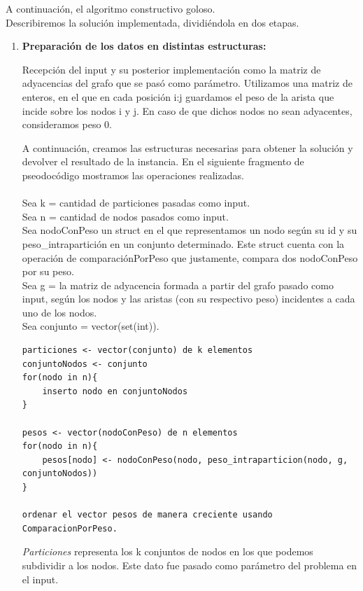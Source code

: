 \documentclass[10pt,a4paper]{article}
\begin{document}
A continuación, el algoritmo constructivo goloso.\\
Describiremos la solución implementada, dividiéndola en dos etapas.

\bigskip
\begin{enumerate}
\item


\textbf{Preparación de los datos en distintas estructuras:} 

Recepción del input y su posterior implementación como la matriz de adyacencias del grafo que se pasó como parámetro. Utilizamos una matriz de enteros, en el que en cada posición i:j guardamos el peso de la arista que incide sobre los nodos i y j. En caso de que dichos nodos no sean adyacentes, consideramos peso 0.

A continuación, creamos las estructuras necesarias para obtener la solución y devolver el resultado de la instancia. En el siguiente fragmento de pseodocódigo mostramos las operaciones realizadas.\\\\

Sea k = cantidad de particiones pasadas como input.\\
Sea n = cantidad de nodos pasados como input.\\
Sea nodoConPeso un struct en el que representamos un nodo según su id y su peso\_intrapartición en un conjunto determinado. Este struct cuenta con la operación de comparaciónPorPeso que justamente, compara dos nodoConPeso por su peso.\\
Sea g = la matriz de adyacencia formada a partir del grafo pasado como input, según los nodos y las aristas (con su respectivo peso) incidentes a cada uno de los nodos.\\
Sea conjunto = vector(set(int)).\\
\newpage

\begin{lstlisting}[mathescape]
particiones <- vector(conjunto) de k elementos
conjuntoNodos <- conjunto
for(nodo in n){
	inserto nodo en conjuntoNodos
}

pesos <- vector(nodoConPeso) de n elementos
for(nodo in n){
	pesos[nodo] <- nodoConPeso(nodo, peso_intraparticion(nodo, g, conjuntoNodos))
}

ordenar el vector pesos de manera creciente usando ComparacionPorPeso.
\end{lstlisting}


\textit{Particiones} representa los k conjuntos de nodos en los que podemos subdividir a los nodos. Este dato fue pasado como parámetro del problema en el input.


\end{enumerate}
\end{document}

